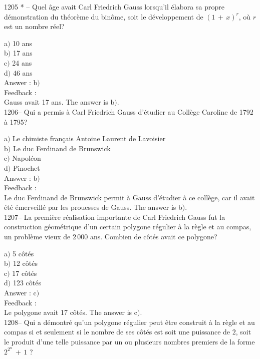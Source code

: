 \documentclass[letterpaper, 12pt]{article}
\begin{document}
1205 * -- Quel \^age avait Carl Friedrich Gauss lorsqu'il \'elabora
sa propre d\'emonstration du th\'eor\`eme du bin\^ome, soit le
d\'eveloppement de $(1\,+\,x)^r$, o\`u $r$ est un nombre r\'eel?

a$)$ 10 ans \\
b$)$ 17 ans \\
c$)$ 24 ans \\
d$)$ 46 ans\\

Answer : b$)$\\

Feedback : \\
Gauss avait 17 ans.
The answer is b$)$.\\

1206-- Qui a permis \`a Carl Friedrich Gauss d'\'etudier au
Coll\`ege Caroline de 1792 \`a 1795?

a$)$ Le chimiste fran\c cais Antoine Laurent de Lavoisier \\
b$)$ Le duc Ferdinand de Brunswick \\
c$)$ Napol\'eon \\
d$)$ Pinochet\\

Answer : b$)$\\

Feedback : \\
Le duc Ferdinand de Brunswick permit \`a Gauss d'\'etudier \`a ce
coll\`ege, car il avait \'et\'e \'emerveill\'e par les prouesses de
Gauss.
The answer is b$)$.\\

1207-- La premi\`ere r\'ealisation importante de Carl Friedrich
Gauss fut la construction g\'eom\'etrique d'un certain polygone
r\'egulier \`a la r\`egle et au compas, un probl\`eme vieux de
$2\,000$ ans. Combien de c\^ot\'es avait ce polygone?

a$)$ 5 c\^ot\'es\\
b$)$ 12 c\^ot\'es\\
c$)$ 17 c\^ot\'es\\
d$)$ 123 c\^ot\'es\\

Answer : c$)$\\

Feedback : \\
Le polygone avait 17 c\^ot\'es.
The answer is c$)$.\\

1208-- Qui a d\'emontr\'e qu'un polygone r\'egulier peut \^etre
construit \`a la r\`egle et au compas si et seulement si le nombre
de ses c\^ot\'es est soit une puissance de $2$, soit le produit
d'une telle puissance par un ou plusieurs nombres premiers de la
forme $2^{2^n}\,+\,1$ ?
\end{document}
